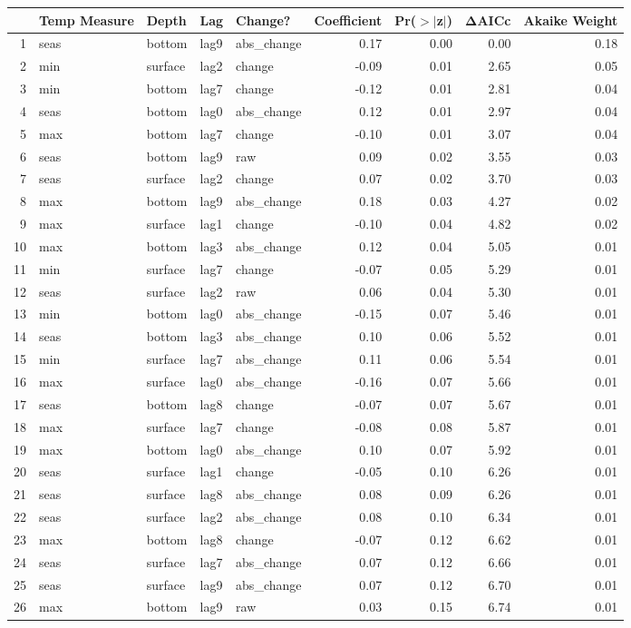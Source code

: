 % 
\begin{tabular}{rllllrrrr}
  \hline
 & Temp Measure & Depth & Lag & Change? & Coefficient & Pr($>$$|$z$|$) & ΔAICc & Akaike Weight \\ 
  \hline
1 & seas & bottom & lag9 & abs\_change & 0.17 & 0.00 & 0.00 & 0.18 \\ 
  2 & min & surface & lag2 & change & -0.09 & 0.01 & 2.65 & 0.05 \\ 
  3 & min & bottom & lag7 & change & -0.12 & 0.01 & 2.81 & 0.04 \\ 
  4 & seas & bottom & lag0 & abs\_change & 0.12 & 0.01 & 2.97 & 0.04 \\ 
  5 & max & bottom & lag7 & change & -0.10 & 0.01 & 3.07 & 0.04 \\ 
  6 & seas & bottom & lag9 & raw & 0.09 & 0.02 & 3.55 & 0.03 \\ 
  7 & seas & surface & lag2 & change & 0.07 & 0.02 & 3.70 & 0.03 \\ 
  8 & max & bottom & lag9 & abs\_change & 0.18 & 0.03 & 4.27 & 0.02 \\ 
  9 & max & surface & lag1 & change & -0.10 & 0.04 & 4.82 & 0.02 \\ 
  10 & max & bottom & lag3 & abs\_change & 0.12 & 0.04 & 5.05 & 0.01 \\ 
  11 & min & surface & lag7 & change & -0.07 & 0.05 & 5.29 & 0.01 \\ 
  12 & seas & surface & lag2 & raw & 0.06 & 0.04 & 5.30 & 0.01 \\ 
  13 & min & bottom & lag0 & abs\_change & -0.15 & 0.07 & 5.46 & 0.01 \\ 
  14 & seas & bottom & lag3 & abs\_change & 0.10 & 0.06 & 5.52 & 0.01 \\ 
  15 & min & surface & lag7 & abs\_change & 0.11 & 0.06 & 5.54 & 0.01 \\ 
  16 & max & surface & lag0 & abs\_change & -0.16 & 0.07 & 5.66 & 0.01 \\ 
  17 & seas & bottom & lag8 & change & -0.07 & 0.07 & 5.67 & 0.01 \\ 
  18 & max & surface & lag7 & change & -0.08 & 0.08 & 5.87 & 0.01 \\ 
  19 & max & bottom & lag0 & abs\_change & 0.10 & 0.07 & 5.92 & 0.01 \\ 
  20 & seas & surface & lag1 & change & -0.05 & 0.10 & 6.26 & 0.01 \\ 
  21 & seas & surface & lag8 & abs\_change & 0.08 & 0.09 & 6.26 & 0.01 \\ 
  22 & seas & surface & lag2 & abs\_change & 0.08 & 0.10 & 6.34 & 0.01 \\ 
  23 & max & bottom & lag8 & change & -0.07 & 0.12 & 6.62 & 0.01 \\ 
  24 & seas & surface & lag7 & abs\_change & 0.07 & 0.12 & 6.66 & 0.01 \\ 
  25 & seas & surface & lag9 & abs\_change & 0.07 & 0.12 & 6.70 & 0.01 \\ 
  26 & max & bottom & lag9 & raw & 0.03 & 0.15 & 6.74 & 0.01 \\ 
   \hline
\end{tabular}
